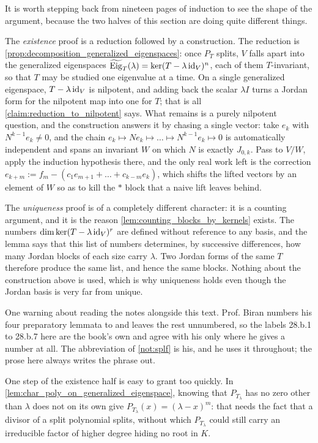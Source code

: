 \begin{ainote}
It is worth stepping back from nineteen pages of induction to see the shape of
the argument, because the two halves of this section are doing quite different
things.

The \emph{existence} proof is a reduction followed by a construction. The
reduction is \cref{prop:decomposition_generalized_eigenspaces}: once $P_T$
splits, $V$ falls apart into the generalized eigenspaces
$\widetilde{\operatorname{Eig}}_T(\lambda) = \ker(T - \lambda \operatorname{id}_V)^n$, each of them $T$-invariant, so
that $T$ may be studied one eigenvalue at a time. On a single generalized
eigenspace, $T - \lambda \operatorname{id}_V$ is nilpotent, and adding back the scalar
$\lambda I$ turns a Jordan form for the nilpotent map into one for $T$; that is
all \cref{claim:reduction_to_nilpotent} says. What remains is a purely nilpotent
question, and the construction answers it by chasing a single vector: take $e_k$
with $N^{k-1} e_k \neq 0$, and the chain
$e_k \mapsto N e_k \mapsto \dots \mapsto N^{k-1} e_k \mapsto 0$ is automatically
independent and spans an invariant $W$ on which $N$ is exactly $J_{0,k}$. Pass to
$V/W$, apply the induction hypothesis there, and the only real work left is the
correction $e_{k+m} := f_m - (c_1 e_{m+1} + \dots + c_{k-m} e_k)$, which shifts
the lifted vectors by an element of $W$ so as to kill the $*$ block that a naive
lift leaves behind.

The \emph{uniqueness} proof is of a completely different character: it is a
counting argument, and it is the reason \cref{lem:counting_blocks_by_kernels}
exists. The numbers $\dim \ker(T - \lambda \operatorname{id}_V)^r$ are defined without
reference to any basis, and the lemma says that this list of numbers determines,
by successive differences, how many Jordan blocks of each size carry $\lambda$.
Two Jordan forms of the same $T$ therefore produce the same list, and hence the
same blocks. Nothing about the construction above is used, which is why
uniqueness holds even though the Jordan basis is very far from unique.

One warning about reading the notes alongside this text. Prof. Biran numbers his
four preparatory lemmata  to  and leaves the rest
unnumbered, so the labels 28.b.1 to 28.b.7 here are the book's own and agree
with his only where he gives a number at all. The abbreviation  of
\cref{not:splf} is his, and he uses it throughout; the prose here always writes
the phrase out.

One step of the existence half is easy to grant too quickly. In
\cref{lem:char_poly_on_generalized_eigenspace}, knowing that $P_{T_\lambda}$ has
no zero other than $\lambda$ does not on its own give
$P_{T_\lambda}(x) = (\lambda - x)^m$: that needs the fact that a divisor of a
split polynomial splits, without which $P_{T_\lambda}$ could still carry an
irreducible factor of higher degree hiding no root in $K$.
\end{ainote}


